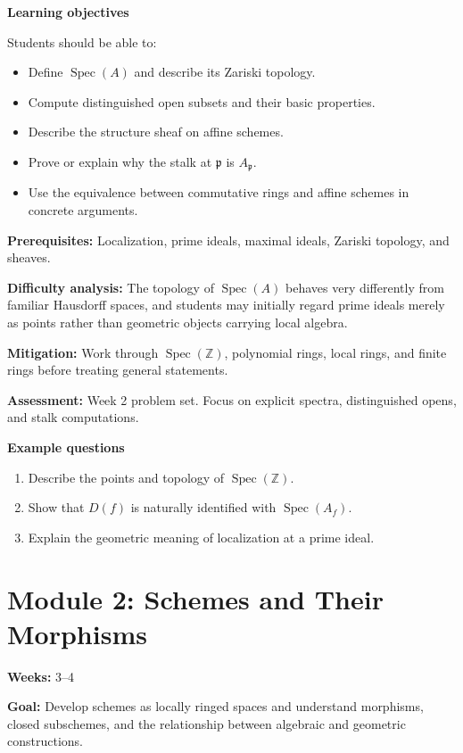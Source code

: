 \documentclass[11pt]{article}
\begin{document}
\textbf{Learning objectives}

Students should be able to:
\begin{itemize}
    \item Define $\operatorname{Spec}(A)$ and describe its Zariski topology.
    \item Compute distinguished open subsets and their basic properties.
    \item Describe the structure sheaf on affine schemes.
    \item Prove or explain why the stalk at $\mathfrak p$ is $A_{\mathfrak p}$.
    \item Use the equivalence between commutative rings and affine schemes in concrete arguments.
\end{itemize}

\textbf{Prerequisites:} Localization, prime ideals, maximal ideals, Zariski topology, and sheaves.

\textbf{Difficulty analysis:} The topology of $\operatorname{Spec}(A)$ behaves very differently from familiar Hausdorff spaces, and students may initially regard prime ideals merely as points rather than geometric objects carrying local algebra.

\textbf{Mitigation:} Work through $\operatorname{Spec}(\mathbb Z)$, polynomial rings, local rings, and finite rings before treating general statements.

\textbf{Assessment:} Week 2 problem set. Focus on explicit spectra, distinguished opens, and stalk computations.

\textbf{Example questions}
\begin{enumerate}
    \item Describe the points and topology of $\operatorname{Spec}(\mathbb Z)$.
    \item Show that $D(f)$ is naturally identified with $\operatorname{Spec}(A_f)$.
    \item Explain the geometric meaning of localization at a prime ideal.
\end{enumerate}

\section{Module 2: Schemes and Their Morphisms}

\textbf{Weeks:} 3--4

\textbf{Goal:} Develop schemes as locally ringed spaces and understand morphisms, closed subschemes, and the relationship between algebraic and geometric constructions.
\end{document}
